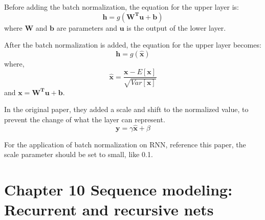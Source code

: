\documentclass[12pt]{article}
\numberwithin{equation}{section}
\begin{document}
	Before adding the batch normalization, the equation for the upper layer is:
	\begin{equation}
		\bm{h}=g(\bm{W^Tu+b})
	\end{equation}
	where $\bm{W}$ and $\bm{b}$ are parameters and $\bm{u}$ is the output of the lower layer.\par
	After the batch normalization is added, the equation for the upper layer becomes:
	\begin{equation}
		\bm{h}=g(\bm{\bm{\hat{x}}})
	\end{equation}
	where, 
	\begin{equation}
		\bm{\hat{x}}=\frac{\bm{x}-E[\bm{x}]}{\sqrt{Var[\bm{x}]}}
	\end{equation}
	and $\bm{x}=\bm{W^Tu+b}$. \par
	In the original paper\citep{ioffe2015batch}, they added a scale and shift to the normalized value, to prevent the change of what the layer can represent. 
	\begin{equation}
		\bm{y}=\gamma \bm{\hat{x}}+\beta
	\end{equation} \par
	For the application of batch normalization on RNN, reference this paper\citep{cooijmans2016recurrent}, the scale parameter should be set to small, like 0.1. \par
\section{Chapter 10 Sequence modeling: Recurrent and recursive nets}
\end{document}
